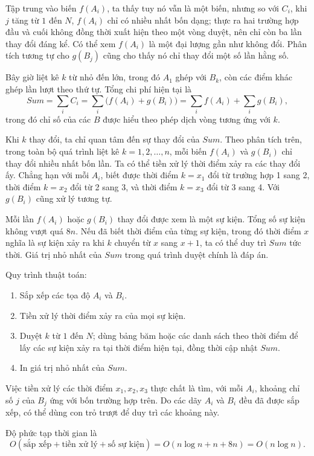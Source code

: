 \documentclass[11pt]{article}
\begin{document}
Tập trung vào biến $f(A_i)$, ta thấy tuy nó vẫn là một biến, nhưng so với
$C_i$, khi $j$ tăng từ $1$ đến $N$, $f(A_i)$ chỉ có nhiều nhất bốn dạng; thực
ra hai trường hợp đầu và cuối không đồng thời xuất hiện theo một vòng duyệt,
nên chỉ còn ba lần thay đổi đáng kể. Có thể xem $f(A_i)$ là một đại lượng gần
như không đổi. Phân tích tương tự cho $g(B_j)$ cũng cho thấy nó chỉ thay đổi
một số lần hằng số.

Bây giờ liệt kê $k$ từ nhỏ đến lớn, trong đó $A_1$ ghép với $B_k$, còn các
điểm khác ghép lần lượt theo thứ tự. Tổng chi phí hiện tại là
\[
  Sum=\sum_i C_i=\sum_i\bigl(f(A_i)+g(B_i)\bigr)
  =\sum_i f(A_i)+\sum_i g(B_i),
\]
trong đó chỉ số của các $B$ được hiểu theo phép dịch vòng tương ứng với $k$.

Khi $k$ thay đổi, ta chỉ quan tâm đến sự thay đổi của $Sum$. Theo phân tích
trên, trong toàn bộ quá trình liệt kê $k=1,2,\ldots,n$, mỗi biến $f(A_i)$ và
$g(B_i)$ chỉ thay đổi nhiều nhất bốn lần. Ta có thể tiền xử lý thời điểm xảy
ra các thay đổi ấy. Chẳng hạn với mỗi $A_i$, biết được thời điểm $k=x_1$ đổi
từ trường hợp 1 sang 2, thời điểm $k=x_2$ đổi từ 2 sang 3, và thời điểm
$k=x_3$ đổi từ 3 sang 4. Với $g(B_i)$ cũng xử lý tương tự.

Mỗi lần $f(A_i)$ hoặc $g(B_i)$ thay đổi được xem là một sự kiện. Tổng số sự
kiện không vượt quá $8n$. Nếu đã biết thời điểm của từng sự kiện, trong đó
thời điểm $x$ nghĩa là sự kiện xảy ra khi $k$ chuyển từ $x$ sang $x+1$, ta có
thể duy trì $Sum$ tức thời. Giá trị nhỏ nhất của $Sum$ trong quá trình duyệt
chính là đáp án.

Quy trình thuật toán:
\begin{enumerate}
  \item Sắp xếp các tọa độ $A_i$ và $B_i$.
  \item Tiền xử lý thời điểm xảy ra của mọi sự kiện.
  \item Duyệt $k$ từ $1$ đến $N$; dùng bảng băm hoặc các danh sách theo thời
  điểm để lấy các sự kiện xảy ra tại thời điểm hiện tại, đồng thời cập nhật
  $Sum$.
  \item In giá trị nhỏ nhất của $Sum$.
\end{enumerate}

Việc tiền xử lý các thời điểm $x_1,x_2,x_3$ thực chất là tìm, với mỗi $A_i$,
khoảng chỉ số $j$ của $B_j$ ứng với bốn trường hợp trên. Do các dãy $A_i$ và
$B_i$ đều đã được sắp xếp, có thể dùng con trỏ trượt để duy trì các khoảng
này.

Độ phức tạp thời gian là
\[
  O(\text{sắp xếp}+\text{tiền xử lý}+\text{số sự kiện})
  =O(n\log n+n+8n)=O(n\log n).
\]
\end{document}
